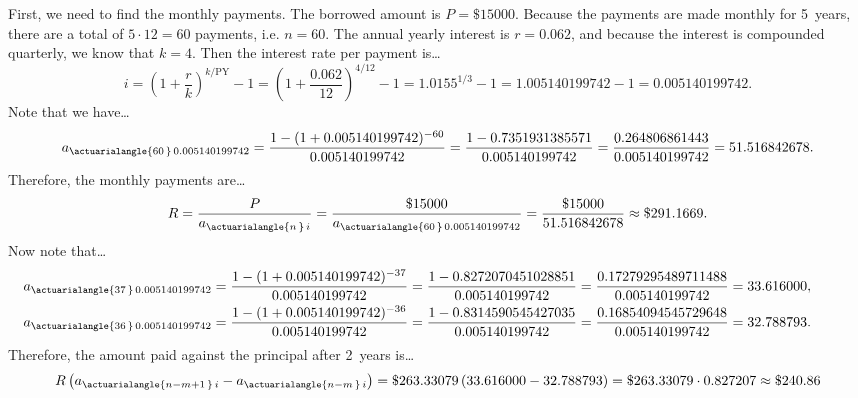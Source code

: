 \documentclass[11pt,letterpaper]{article}
\begin{document}
First, we need to find the monthly payments. The borrowed amount is $P= \$15000$. Because the payments are made monthly for 5~years, there are a total of $5 \cdot 12= 60$ payments, i.e. $n= 60$. The annual yearly interest is $r= 0.062$, and because the interest is compounded quarterly, we know that $k= 4$. Then the interest rate per payment is\dots \pspace 
	\[
	i= \left( 1 + \dfrac{r}{k} \right)^{k/\text{PY}} - 1= \left( 1 + \dfrac{0.062}{12} \right)^{4/12} - 1= 1.0155^{1/3} - 1= 1.005140199742 - 1= 0.005140199742.
	\] \pspace
Note that we have\dots \pspace
	\[
	a_{\actuarialangle{60\,}\, 0.005140199742}= \dfrac{1 - (1 + 0.005140199742)^{-60}}{0.005140199742}= \dfrac{1 - 0.7351931385571}{0.005140199742}= \dfrac{0.264806861443}{0.005140199742}= 51.516842678.
	\] \pspace
Therefore, the monthly payments are\dots \pspace
	\[
	R= \dfrac{P}{a_{\actuarialangle{n\,}\, i}}= \dfrac{\$15000}{a_{\actuarialangle{60\,}\, 0.005140199742}}= \dfrac{\$15000}{51.516842678} \approx \$291.1669.
	\] \pspace
Now note that\dots \pspace
	\[
	\begin{aligned}
	\hspace{-1cm}a_{\actuarialangle{37\,}\, 0.005140199742}&= \dfrac{1 - (1 + 0.005140199742)^{-37}}{0.005140199742}= \dfrac{1 - 0.8272070451028851}{0.005140199742}= \dfrac{0.17279295489711488}{0.005140199742}= 33.616000, \\
	\hspace{-1cm}a_{\actuarialangle{36\,}\, 0.005140199742}&= \dfrac{1 - (1 + 0.005140199742)^{-36}}{0.005140199742}= \dfrac{1 - 0.8314590545427035}{0.005140199742}= \dfrac{0.16854094545729648}{0.005140199742}= 32.788793.
	\end{aligned}
	\] \pspace
Therefore, the amount paid against the principal after 2~years is\dots 
	\[
	R \left( a_{\actuarialangle{n - m + 1\,}\, i} - a_{\actuarialangle{n - m\,}\, i} \right)= \$263.33079 \left( 33.616000 - 32.788793 \right)= \$263.33079 \cdot 0.827207 \approx \$240.86
	\]
\end{document}
